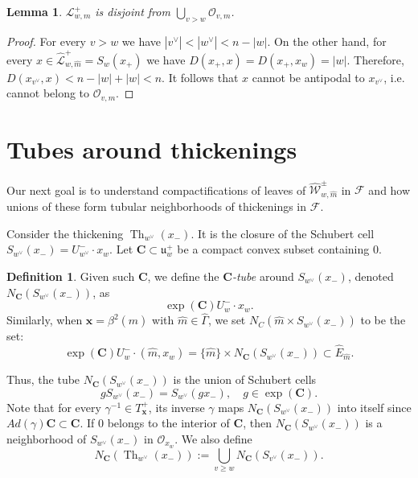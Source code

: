 \documentclass[12pt]{amsbook}%
\newtheorem{lem}[thm]{Lemma}
\theoremstyle{definition}
\newtheorem{defi}[thm]{Definition}
\theoremstyle{remark}
\numberwithin{section}{chapter}
\numberwithin{subsection}{section}
\numberwithin{figure}{chapter}
\DeclareMathOperator{\Th}{Th}
\def\cF{{\mathscr{F}}}
\def\cO{{\mathscr{O}}}
\def\cW{{\mathscr{W}}}
\def\CC{{\mathbf{C}}}
\def\bx{\mathbf{x}}
\def\ga{\gamma}
\def\cL{{\mathscr{L}}}
\begin{document}
{{\begin{enumerate}
\end{enumerate}


\begin{lem}\label{lem:disjoint}
$\cL^+_{w,m}$ is disjoint from $\bigcup_{v>w} \cO_{v,m}$. 
\end{lem}
\begin{proof} For every $v> w$ we have $|v^\vee|< |w^\vee|< n-|w|$. On the other hand, for every $x\in \hat{\cL}^+_{w,\hat{m}}= S_w(x_+)$ we have 
$D(x_+, x)=D(x_+,x_w)=|w|$. Therefore, $D(x_{v^\vee}, x)< n-|w|+|w|<n$. It follows that $x$ cannot be antipodal to $x_{v^\vee}$, i.e. 
cannot belong to $\cO_{v,m}$. 
\end{proof}


\section{Tubes around thickenings}\label{sec:tubes}

Our next goal is to understand compactifications of leaves of $\hat{\cW}^\pm_{w,\hat{m}}$ in $\cF$ and how unions of these form tubular neighborhoods of thickenings in $\cF$.  

 Consider the thickening $\Th_{w^\vee}(x_-)$. It is the closure of the 
Schubert cell $S_{w^\vee}(x_-)=U^-_{w^\vee}\cdot x_w$. Let $\CC\subset \mathfrak{u}_w^+$ 
be a compact convex subset containing $0$. 

\begin{defi}\label{def:tube}
Given such $\CC$,  
we define the {\em $\CC$-tube} around $S_{w^\vee}(x_-)$, denoted $N_{\CC}(S_{w^\vee}(x_-))$, as
$$
\exp(\CC)U^-_w \cdot x_w. 
$$
Similarly, when $\bx = \beta^2(\hat{m})$ with $\hat{m} \in \hat\Gamma$, we set $N_C(\hat{m} \times S_{w^\vee}(x_-))$ to be the set: 
\begin{equation*}
\exp(\CC) U_w^- \cdot (\hat{m},x_w )= \{ \hat{m} \} \times N_{\CC}(S_{w^\vee}(x_-))  \subset \hat{E}_{\hat{m}}. 
\end{equation*}
\end{defi} 

Thus, the tube $N_{\CC}(S_{w^\vee}(x_-))$ is the union of Schubert cells 
$$
g  S_{w^\vee}(x_-)= S_{w^\vee}(g x_-), \quad g\in \exp({\CC}).
$$ 
Note that for every $\ga^{-1}\in T_{\bx}^+$, its inverse $\ga$ 
maps $N_{\CC}(S_{w^\vee}(x_-))$ into itself since  $Ad(\ga)\CC\subset \CC$.  
If $0$ belongs to the interior of $\CC$, then $N_{\CC}(S_{w^\vee}(x_-))$ is a neighborhood of $S_{w^\vee}(x_-)$ in 
$\cO_{x_w}$. We also define
$$
N_{\CC}(\Th_{w^\vee}(x_-)):= \bigcup_{v\ge w} N_{\CC}(S_{v^\vee}(x_-)). 
$$

}}
\end{document}
